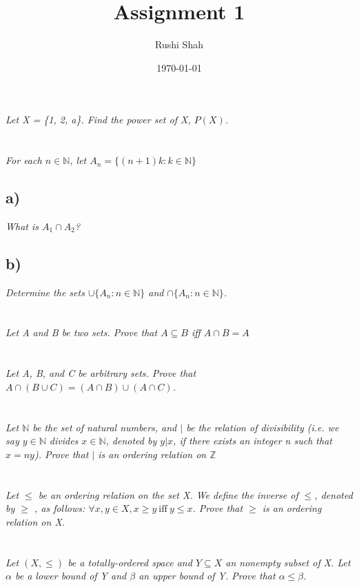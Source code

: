 \documentclass[]{article}
\author{Rushi Shah}
\date{\today}
\title{Assignment 1}
\newcommand{\integers}{\mathbb{Z}}
\newcommand{\naturals}{\mathbb{N}}
\begin{document}
	\maketitle

	\section{}
		\textit{Let X = \{1, 2, a\}. Find the power set of X, $P(X)$.}

	\section{}
		\textit{For each $n \in \naturals$, let $A_n = \{(n + 1)k : k \in \naturals\}$}

		\subsection*{a)}
		\textit{What is $A_1 \cap A_2$?}
		\subsection*{b)}
		\textit{Determine the sets $\cup\{A_n : n \in \naturals \}$ and $\cap\{A_n : n \in \naturals\}$.}

	\section{}
		\textit{Let A and B be two sets. Prove that $A \subseteq B$ iff $A \cap B = A$}

	\section{}
		\textit{Let A, B, and C be arbitrary sets. Prove that $A \cap (B \cup C) = (A \cap B)\cup (A \cap C)$.}

	\section{}
		\textit{Let $\naturals$ be the set of natural numbers, and $|$ be the relation of divisibility (i.e. we say $y \in \naturals$ divides $x \in \naturals$, denoted by $y|x$, if there exists an integer n such that $x = ny$). Prove that $|$ is an ordering relation on $\integers$}

	\section{}
		\textit{Let $\leq$ be an ordering relation on the set X. We define the inverse of $\leq$, denoted by $\geq$ , as follows: $\forall x, y \in X, x \geq y\ \text{iff}\ y \leq x$. Prove that $\geq$ is an ordering relation on X.}

	\section{}
		\textit{Let $(X,\leq)$ be a totally-ordered space and $Y \subseteq X$ an nonempty subset of X. Let $\alpha$ be a lower bound of Y and $\beta$ an upper bound of Y. Prove that $\alpha \leq \beta$.}
\end{document}

